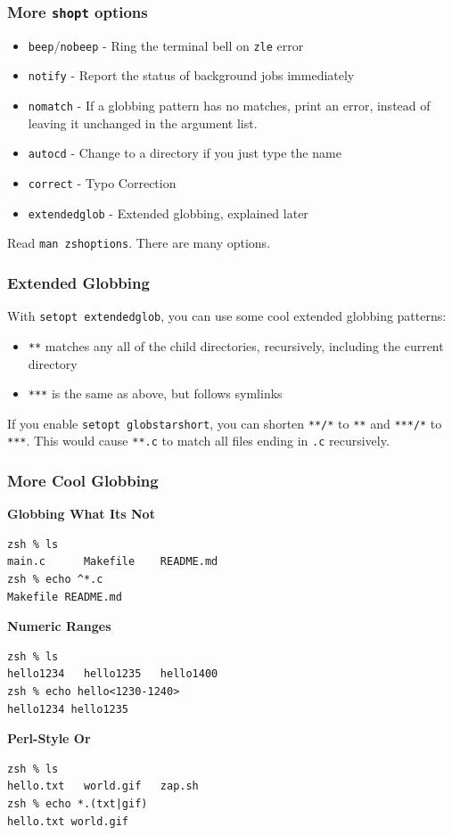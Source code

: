 \documentclass{beamer}
\begin{document}
\begin{frame}
    \frametitle{More \texttt{shopt} options}
    \begin{itemize}
        \item \texttt{beep}/\texttt{nobeep} - Ring the terminal bell on \texttt{zle} error
        \item \texttt{notify} - Report the status of background jobs
            immediately
        \item \texttt{nomatch} - If a globbing pattern has no matches, print an
            error, instead of leaving it unchanged in the argument list.
        \item \texttt{autocd} - Change to a directory if you just type the name
        \item \texttt{correct} - Typo Correction
        \item \texttt{extendedglob} - Extended globbing, explained later
    \end{itemize}

    Read \texttt{man zshoptions}. There are many options.

\end{frame}

\begin{frame}
    \frametitle{Extended Globbing}
    With \texttt{setopt extendedglob}, you can use some cool extended globbing
    patterns:
    \begin{itemize}
        \item \texttt{**} matches any all of the child directories,
            recursively, including the current directory
        \item \texttt{***} is the same as above, but follows symlinks
    \end{itemize}

    If you enable \texttt{setopt globstarshort}, you can shorten \texttt{**/*}
    to \texttt{**} and \texttt{***/*} to \texttt{***}. This would cause
    \texttt{**.c} to match all files ending in \texttt{.c} recursively.
\end{frame}

\begin{frame}[fragile]
    \frametitle{More Cool Globbing}
    \textbf{Globbing What Its Not}
    \begin{verbatim}
zsh % ls
main.c      Makefile    README.md
zsh % echo ^*.c
Makefile README.md\end{verbatim}
    \pause

    \vfill
    \textbf{Numeric Ranges}
    \begin{verbatim}
zsh % ls
hello1234   hello1235   hello1400
zsh % echo hello<1230-1240>
hello1234 hello1235\end{verbatim}
    \pause

    \vfill
    \textbf{Perl-Style Or}
    \begin{verbatim}
zsh % ls
hello.txt   world.gif   zap.sh
zsh % echo *.(txt|gif)
hello.txt world.gif\end{verbatim}
\end{frame}
\end{document}

